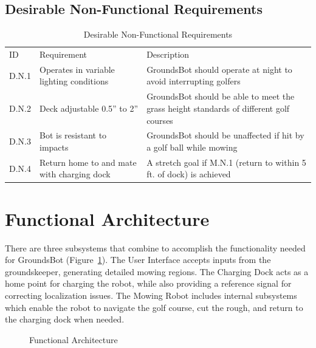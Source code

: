 \documentclass[12pt]{extarticle}
\begin{document}
\subsection{Desirable Non-Functional Requirements}
\begin{center}
  \begin{table}[H]
  	\caption{Desirable Non-Functional Requirements}
  	\label{table: desirable non-functional}

  	\def\arraystretch{1.5}
	\begin{tabularx}{\textwidth}{ lXX }
  	\hline
  	  \sffamily\normalsize{ID} & \sffamily\normalsize{Requirement} &
  	  \sffamily\normalsize{Description} \\
  	  D.N.1 &
  	  Operates in variable lighting conditions &
  	  GroundsBot should operate at night to avoid interrupting golfers\\
  	  D.N.2 &
  	  Deck adjustable 0.5” to 2” &
  	  GroundsBot should be able to meet the grass height standards of different golf courses\\
  	  D.N.3 &
  	  Bot is resistant to impacts &
  	  GroundsBot should be unaffected if hit by a golf ball while mowing\\
  	  D.N.4 &
  	  Return home to and mate with charging dock &
  	  A stretch goal if M.N.1 (return to within 5 ft. of dock) is achieved \\
	\end{tabularx}
  \end{table}
\end{center}


\newpage
\section{Functional Architecture}
  There are three subsystems that combine to accomplish the functionality needed for GroundsBot (Figure~\ref{fig:functional}). The User Interface accepts inputs from the groundskeeper, generating detailed mowing regions. The Charging Dock acts as a home point for charging the robot, while also providing a reference signal for correcting localization issues. The Mowing Robot includes internal subsystems which enable the robot to navigate the golf course, cut the rough, and return to the charging dock when needed.\\
  
\begin{figure}[H]
\centering
\def\svgwidth{\columnwidth}

\caption{Functional Architecture}
\label{fig:functional}
\end{figure}
\end{document}
